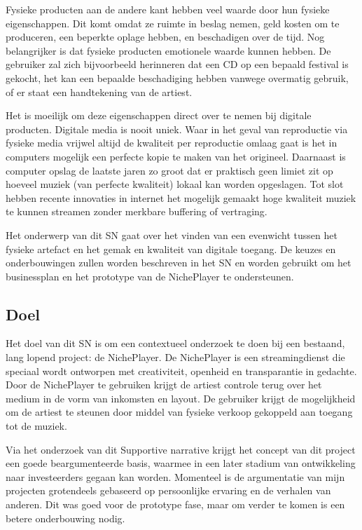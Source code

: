 Fysieke producten aan de andere kant hebben veel waarde door hun fysieke eigenschappen. Dit komt omdat ze ruimte in beslag nemen, geld kosten om te produceren, een beperkte oplage hebben, en beschadigen over de tijd. Nog belangrijker is dat fysieke producten emotionele waarde kunnen hebben. De gebruiker zal zich bijvoorbeeld herinneren dat een CD op een bepaald festival is gekocht, het kan een bepaalde beschadiging hebben vanwege overmatig gebruik, of er staat een handtekening van de artiest.

Het is moeilijk om deze eigenschappen direct over te nemen bij digitale producten. Digitale media is nooit uniek. Waar in het geval van reproductie via fysieke media vrijwel altijd de kwaliteit per reproductie omlaag gaat is het in computers mogelijk een perfecte kopie te maken van het origineel. Daarnaast is computer opslag de laatste jaren zo groot dat er praktisch geen limiet zit op hoeveel muziek (van perfecte kwaliteit) lokaal kan worden opgeslagen. Tot slot hebben recente innovaties in internet het mogelijk gemaakt hoge kwaliteit muziek te kunnen streamen zonder merkbare buffering of vertraging.

Het onderwerp van dit SN gaat over het vinden van een evenwicht tussen het fysieke artefact en het gemak en kwaliteit van digitale toegang. De keuzes en onderbouwingen zullen worden beschreven in het SN en worden gebruikt om het businessplan en het prototype van de NichePlayer te ondersteunen.

\subsection{Doel}
Het doel van dit SN is om een contextueel onderzoek te doen bij een bestaand, lang lopend project: de NichePlayer. De NichePlayer is een streamingdienst die speciaal wordt ontworpen met creativiteit, openheid en transparantie in gedachte. Door de NichePlayer te gebruiken krijgt de artiest controle terug over het medium in de vorm van inkomsten en layout. De gebruiker krijgt de mogelijkheid om de artiest te steunen door middel van fysieke verkoop gekoppeld aan toegang tot de muziek. 

Via het onderzoek van dit Supportive narrative krijgt het concept van dit project een goede beargumenteerde basis, waarmee in een later stadium van ontwikkeling naar investeerders gegaan kan worden. Momenteel is de argumentatie van mijn projecten grotendeels gebaseerd op persoonlijke ervaring en de verhalen van anderen. Dit was goed voor de prototype fase, maar om verder te komen is een betere onderbouwing nodig.

